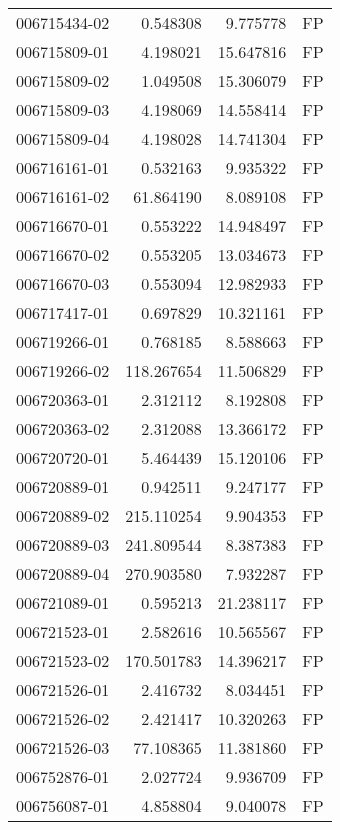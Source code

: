 \begin{tabular}{lrrl}
006715434-02 &    0.548308 &       9.775778 &   FP \\
006715809-01 &    4.198021 &      15.647816 &   FP \\
006715809-02 &    1.049508 &      15.306079 &   FP \\
006715809-03 &    4.198069 &      14.558414 &   FP \\
006715809-04 &    4.198028 &      14.741304 &   FP \\
006716161-01 &    0.532163 &       9.935322 &   FP \\
006716161-02 &   61.864190 &       8.089108 &   FP \\
006716670-01 &    0.553222 &      14.948497 &   FP \\
006716670-02 &    0.553205 &      13.034673 &   FP \\
006716670-03 &    0.553094 &      12.982933 &   FP \\
006717417-01 &    0.697829 &      10.321161 &   FP \\
006719266-01 &    0.768185 &       8.588663 &   FP \\
006719266-02 &  118.267654 &      11.506829 &   FP \\
006720363-01 &    2.312112 &       8.192808 &   FP \\
006720363-02 &    2.312088 &      13.366172 &   FP \\
006720720-01 &    5.464439 &      15.120106 &   FP \\
006720889-01 &    0.942511 &       9.247177 &   FP \\
006720889-02 &  215.110254 &       9.904353 &   FP \\
006720889-03 &  241.809544 &       8.387383 &   FP \\
006720889-04 &  270.903580 &       7.932287 &   FP \\
006721089-01 &    0.595213 &      21.238117 &   FP \\
006721523-01 &    2.582616 &      10.565567 &   FP \\
006721523-02 &  170.501783 &      14.396217 &   FP \\
006721526-01 &    2.416732 &       8.034451 &   FP \\
006721526-02 &    2.421417 &      10.320263 &   FP \\
006721526-03 &   77.108365 &      11.381860 &   FP \\
006752876-01 &    2.027724 &       9.936709 &   FP \\
006756087-01 &    4.858804 &       9.040078 &   FP \\

\end{tabular}
